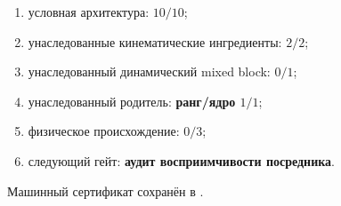 \begin{protocol}\begin{enumerate}
\item условная архитектура: \textbf{$10/10$};
\item унаследованные кинематические ингредиенты: \textbf{$2/2$};
\item унаследованный динамический mixed block: \textbf{$0/1$};
\item унаследованный родитель: \textbf{ранг/ядро $1/1$};
\item физическое происхождение: \textbf{$0/3$};
\item следующий гейт: \textbf{аудит восприимчивости посредника}.
\end{enumerate}\end{protocol}

Машинный сертификат сохранён в
.